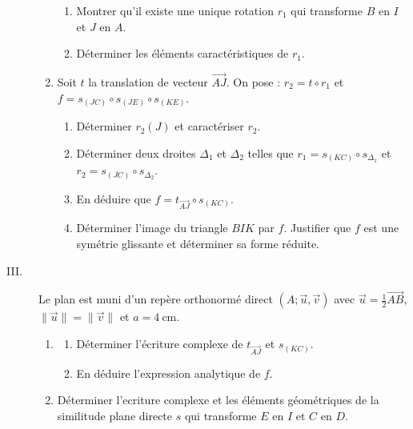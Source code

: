 \begin{exo}
\begin{description}
\begin{enumerate}
\begin{enumerate}
                                    \item Montrer qu'il existe une unique rotation $r_1$ qui transforme 
                                          $B$ en $I$ et $J$ en $A$.
                                    \item D\'eterminer les \'el\'ements caract\'eristiques de $r_1$.
                              \end{enumerate}
                        \item Soit $t$ la translation de vecteur $\overrightarrow{AJ}$.
                              On pose : $r_2 = t \circ r_1$ et $f = s_{(JC)} \circ s_{(JE)} \circ s_{(KE)}$.
                              \begin{enumerate}
                                    \item D\'eterminer $r_2 (J)$ et caract\'eriser $r_2$.
                                    \item D\'eterminer deux droites $\Delta_1$ et $\Delta_2$ telles que
                                          $r_1 = s_{(KC)} \circ s_{\Delta_1}$ et $r_2 = s_{(JC)} \circ s_{\Delta_2}$.
                                    \item En d\'eduire que $f = t_{\overrightarrow{AJ}} \circ s_{(KC)}$.
                                    \item D\'eterminer l'image du triangle $BIK$ par $f$.
                                          Justifier que $f$ est une sym\'etrie glissante et d\'eterminer sa forme r\'eduite.
                              \end{enumerate}
                  \end{enumerate}
            \item[III.]
                  Le plan est muni d'un rep\`ere orthonorm\'e direct $(A;\vec{u},\vec{v})$ avec
                  $\vec{u} = \frac{1}{2} \overrightarrow{AB}$, $\|\vec{u}\| = \|\vec{v}\|$ et $a = 4~\mathrm{cm}$.
                  \begin{enumerate}
                        \item \begin{enumerate}
                                    \item D\'eterminer l'\'ecriture complexe de $t_{\overrightarrow{AJ}}$ et $s_{(KC)}$.
                                    \item En d\'eduire l'expression analytique de $f$.
                              \end{enumerate}
                        \item D\'eterminer l'ecriture complexe et les \'el\'ements g\'eom\'etriques
                              de la similitude plane directe $s$ qui transforme $E$ en $I$ et $C$ en $D$.
                  \end{enumerate}
      \end{description}
\end{exo}
